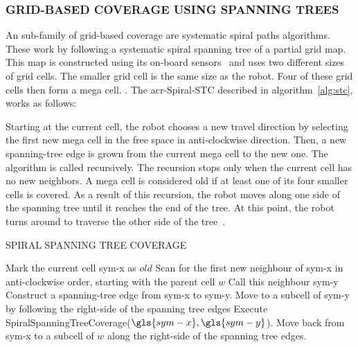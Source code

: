 \subsubsection{GRID-BASED COVERAGE USING SPANNING TREES}
An sub-family of grid-based coverage are systematic spiral paths algorithms. These work by following a systematic spiral
spanning tree of a partial grid map. This map is constructed using its on-board sensors~\cite{galceran_coverage_2014}
and uses two different sizes of grid cells. The smaller grid cell is the same size as the robot. Four of these grid
cells then form a mega cell. \cite{wong_qualitative_2006}. The \gls{acr-Spiral-STC} described in
algorithm~\ref{alg:stc}, works as follows:

Starting at the current cell, the robot chooses a new travel direction by selecting the first new mega cell in the free
space in anti-clockwise direction. Then, a new spanning-tree edge is grown from the current mega cell to the new one.
The algorithm is called recursively. The recursion stops only when the current cell has no new neighbors. A mega cell is
considered old if at least one of its four smaller cells is covered. As a result of this recursion, the robot moves
along one side of the spanning tree until it reaches the end of the tree. At this point, the robot turns around to
traverse the other side of the tree~\cite{galceran_coverage_2014}.

\begin{RoyalAlgorithm}[label=alg:stc]{SPIRAL SPANNING TREE COVERAGE}
    \begin{algorithmic}[1]
            \State Mark the current cell \gls{sym-x} as $ old $
                \State Scan for the first new neighbour of \gls{sym-x} in anti-clockwise order, starting with the 
				parent cell $ w $ Call this neighbour \gls{sym-y}
                \State Construct a spanning-tree edge from \gls{sym-x} to \gls{sym-y}.
                \State Move to a subcell of \gls{sym-y} by following the right-side of the spanning tree edges
                \State Execute SpiralSpanningTreeCoverage($\gls{sym-x},\gls{sym-y}$).
            \EndWhile
                \State Move back from \gls{sym-x} to a subcell of $ w $ along the right-side of the spanning tree edges.
            \EndIf
        \EndProcedure
    \end{algorithmic}
\end{RoyalAlgorithm}

